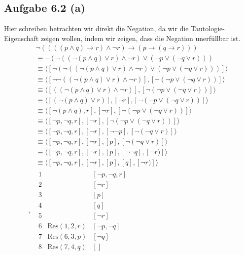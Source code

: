 \documentclass[12pt,a4paper]{article}
\newcommand{\Res}{\text{Res}}
\begin{document}
\subsection*{Aufgabe 6.2 (a)}
Hier schreiben betrachten wir direkt die Negation, da wir die Tautologie-Eigenschaft zeigen wollen, indem wir zeigen, dass die Negation unerfüllbar ist.
\begin{align*}
&\neg((((p\wedge q)\to r)\wedge\neg r)\to(p\to(q\to r)))\\
&\equiv
\neg(\neg((\neg(p\wedge q)\vee r)\wedge\neg r)\vee(\neg p\vee(\neg q\vee r)))\\
&\equiv
\langle[\neg(\neg((\neg(p\wedge q)\vee r)\wedge\neg r)\vee(\neg p\vee(\neg q\vee r)))]\rangle\\
&\equiv
\langle[\neg\neg((\neg(p\wedge q)\vee r)\wedge\neg r)],[\neg(\neg p\vee(\neg q\vee r))]\rangle\\
&\equiv
\langle[((\neg(p\wedge q)\vee r)\wedge\neg r)],[\neg(\neg p\vee(\neg q\vee r))]\rangle\\
&\equiv
\langle[(\neg(p\wedge q)\vee r)],[\neg r],[\neg(\neg p\vee(\neg q\vee r))]\rangle\\
&\equiv
\langle[\neg(p\wedge q), r],[\neg r],[\neg(\neg p\vee(\neg q\vee r))]\rangle\\
&\equiv
\langle[\neg p,\neg q, r],[\neg r],[\neg(\neg p\vee(\neg q\vee r))]\rangle\\
&\equiv
\langle[\neg p,\neg q, r],[\neg r],[\neg\neg p],[\neg(\neg q\vee r)]\rangle\\
&\equiv
\langle[\neg p,\neg q, r],[\neg r],[p],[\neg(\neg q\vee r)]\rangle\\
&\equiv
\langle[\neg p,\neg q, r],[\neg r],[p],[\neg\neg q],[\neg r)]\rangle\\
&\equiv
\langle[\neg p,\neg q, r],[\neg r],[p],[q],[\neg r)]\rangle\\,
&\begin{array}{rll}
1 &&[\neg p,\neg q,r]\\
2 &&[\neg r]\\
3 &&[p]\\
4 &&[q]\\
5 &&[\neg r]\\
6 & \Res(1,2,r) & [\neg p,\neg q]\\
7 & \Res(6,3,p) & [\neg q]\\
8 & \Res(7,4,q) & []
\end{array}
\end{align*}
\end{document}
